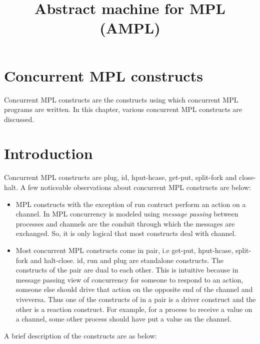 \documentclass[11pt]{article}
\title{Abstract machine for MPL (AMPL)}
\newcommand{\<}{\langle}
\renewcommand{\>}{\rangle}
\begin{document}
\maketitle

\section {Concurrent MPL constructs}
Concurrent MPL constructs are the constructs using which concurrent MPL programs are written. In this chapter, various concurrent MPL constructs are discussed.

\section {Introduction}
Concurrent MPL constructs are {\sf plug}, {\sf id}, {\sf hput-hcase}, {\sf get-put}, {\sf split-fork} and {\sf close-halt}. A few noticeable observations about concurrent MPL constructs are below:
\begin{itemize}
  \item MPL constructs with the exception of {\sf run} contruct perform an action on a channel. In MPL concurrency is modeled using {\em message passing} between processes and channels are the conduit through which the messages are exchanged. So, it is only logical that most constructs deal with channel.
  \item Most concurrent MPL constructs come in pair, i.e {\sf get-put}, {\sf hput-hcase}, {\sf split-fork} and {\sf halt-close}. {\sf id}, {\sf run} and {\sf plug} are standalone constructs. The constructs of the pair are dual to each other.
  This is intuitive because in message passing view of concurrency for someone to respond to an action, someone else should drive that action on the opposite end of the channel and viveversa. Thus one of the constructs of in a pair is a driver construct and the other is a reaction construct. For example, for a process to receive a value on a channel, some other process should have put a value on the channel.
\end{itemize}

A brief description of the constructs are as below:
\end{document}
